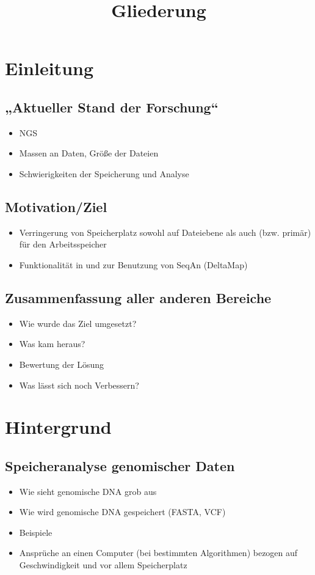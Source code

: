 \documentclass[11pt]{article}
\title{Gliederung}
\begin{document}
\maketitle

\section{Einleitung}
\subsection{„Aktueller Stand der Forschung“}
\begin{itemize}
\item NGS
\item Massen an Daten, Größe der Dateien
\item Schwierigkeiten der Speicherung und Analyse
\end{itemize}

\subsection{Motivation/Ziel}
\begin{itemize}
\item Verringerung von Speicherplatz sowohl auf Dateiebene als auch (bzw. primär) für den Arbeitsspeicher
\item Funktionalität in und zur Benutzung von SeqAn (DeltaMap)
\end{itemize}

\subsection{Zusammenfassung aller anderen Bereiche}
\begin{itemize}
\item Wie wurde das Ziel umgesetzt?
\item Was kam heraus? 
\item Bewertung der Lösung
\item Was lässt sich noch Verbessern?
\end{itemize}

\section{Hintergrund}
\subsection{Speicheranalyse genomischer Daten}
\begin{itemize}
\item Wie sieht genomische DNA grob aus
\item Wie wird genomische DNA gespeichert (FASTA, VCF)
\item Beispiele
\item Ansprüche an einen Computer (bei bestimmten Algorithmen) bezogen auf Geschwindigkeit und vor allem Speicherplatz
\end{itemize}
\end{document}
